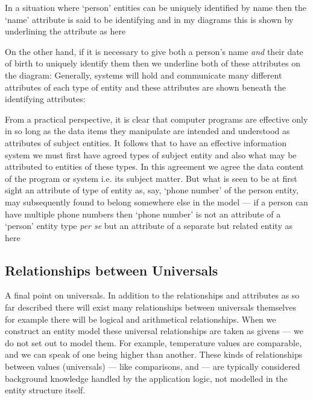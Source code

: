 \mynote
In a situation where `person' entities can be uniquely identified by name then the `name' attribute
is said to be identifying and in my diagrams this is shown by underlining the attribute as here	

On the other hand, if it is necessary to give both a person's name \textit{and} their date of birth to uniquely identify 
them  then we underline
both of these attributes on the diagram:
Generally, systems will hold and communicate many different attributes of each type of entity and
these attributes are shown beneath the identifying attributes:

\mynote 
From a practical perspective, 
it is clear that computer programs are effective only in so long as the data items 
they manipulate are intended and understood as attributes of subject entities. It 
follows that to have an effective information system we must first have agreed types 
of subject entity and also what may be attributed to entities  of these types. 
In this agreement we agree the data content of the program or system i.e.  
its subject matter. But what is seen to be at first sight an attribute of type of entity
as, say, `phone number' of the person entity,  may
subsequently found to belong somewhere else in the model  ---   if a person can have multiple phone numbers then ‘phone number’ is 
not an attribute  of a ‘person’ entity type \textit{per se} but an attribute of a 
separate but related entity as here 


\subsection{Relationships between Universals}
\mynote A final point on universals. In addition to the relationships and attributes as so far described there will exist many relationships between universals themselves
for example there will be logical and arithmetical relationships. When we construct an entity model these universal relationships are taken as givens --- we do not set out to model them.
For example, temperature values are comparable, and we can speak of one being higher than another.
 These kinds of relationships between values (universals) — like comparisons,  and
  — are typically considered background knowledge 
  handled by the application logic, not modelled in the entity structure itself.



